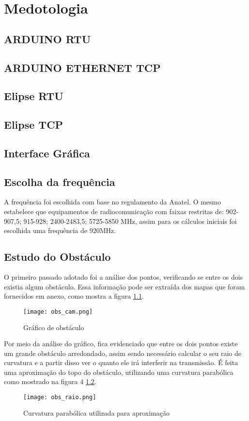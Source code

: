 \chapter{Medotologia}\label{cap:CnptDsng}
\section{ARDUINO RTU}
\section{ARDUINO ETHERNET TCP}
\section{Elipse RTU}
\section{Elipse TCP}
\section{Interface Gráfica}

\section{Escolha da frequência}\label{sec:esc_freq}
A frequência foi escolhida com base no regulamento da Anatel. O mesmo estabelece que equipamentos de radiocomunicação com faixas restritas de: 902-907,5; 915-928; 2400-2483,5; 5725-5850 MHz, assim para os cálculos iniciais foi escolhida uma frequência de 920MHz.

\section{Estudo do Obstáculo}\label{sec:est_obs}
O primeiro passado adotado foi a análise dos pontos, verificando se entre os dois existia algum obstáculo. Essa informação pode ser extraída dos mapas que foram fornecidos em anexo, como mostra a figura \ref{fig:obs_cam}.
\begin{figure}[h]
	\centering
	\texttt{[image: obs\_cam.png]}
	\caption{Gráfico de obstáculo}
	\label{fig:obs_cam}
\end{figure} 

Por meio da análise do gráfico, fica evidenciado que entre os dois pontos existe um grande obstáculo arredondado, assim sendo necessário calcular o seu raio de curvatura e a partir disso ver o quanto ele irá interferir na transmissão.
É feita uma aproximação do topo do obstáculo, utilizando uma curvatura parabólica como mostrado na figura 4 \ref{fig:obs_raio}.
\begin{figure}[h]
	\centering
	\texttt{[image: obs\_raio.png]}
	\label{fig:obs_raio}
	\caption{Curvatura parabólica utilizada para aproximação}
\end{figure} 



